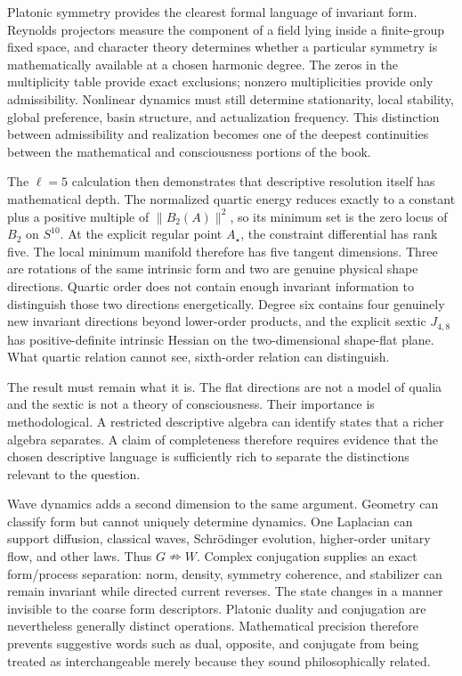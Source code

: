 Platonic symmetry provides the clearest formal language of invariant form. Reynolds projectors measure the component of a field lying inside a finite-group fixed space, and character theory determines whether a particular symmetry is mathematically available at a chosen harmonic degree. The zeros in the multiplicity table provide exact exclusions; nonzero multiplicities provide only admissibility. Nonlinear dynamics must still determine stationarity, local stability, global preference, basin structure, and actualization frequency. This distinction between admissibility and realization becomes one of the deepest continuities between the mathematical and consciousness portions of the book.

The $\ell=5$ calculation then demonstrates that descriptive resolution itself has mathematical depth. The normalized quartic energy reduces exactly to a constant plus a positive multiple of $\|B_2(A)\|^2$, so its minimum set is the zero locus of $B_2$ on $S^{10}$. At the explicit regular point $A_\star$, the constraint differential has rank five. The local minimum manifold therefore has five tangent dimensions. Three are rotations of the same intrinsic form and two are genuine physical shape directions. Quartic order does not contain enough invariant information to distinguish those two directions energetically. Degree six contains four genuinely new invariant directions beyond lower-order products, and the explicit sextic $J_{4,8}$ has positive-definite intrinsic Hessian on the two-dimensional shape-flat plane. What quartic relation cannot see, sixth-order relation can distinguish.

The result must remain what it is. The flat directions are not a model of qualia and the sextic is not a theory of consciousness. Their importance is methodological. A restricted descriptive algebra can identify states that a richer algebra separates. A claim of completeness therefore requires evidence that the chosen descriptive language is sufficiently rich to separate the distinctions relevant to the question.

Wave dynamics adds a second dimension to the same argument. Geometry can classify form but cannot uniquely determine dynamics. One Laplacian can support diffusion, classical waves, Schrödinger evolution, higher-order unitary flow, and other laws. Thus $G\nRightarrow W$. Complex conjugation supplies an exact form/process separation: norm, density, symmetry coherence, and stabilizer can remain invariant while directed current reverses. The state changes in a manner invisible to the coarse form descriptors. Platonic duality and conjugation are nevertheless generally distinct operations. Mathematical precision therefore prevents suggestive words such as dual, opposite, and conjugate from being treated as interchangeable merely because they sound philosophically related.


